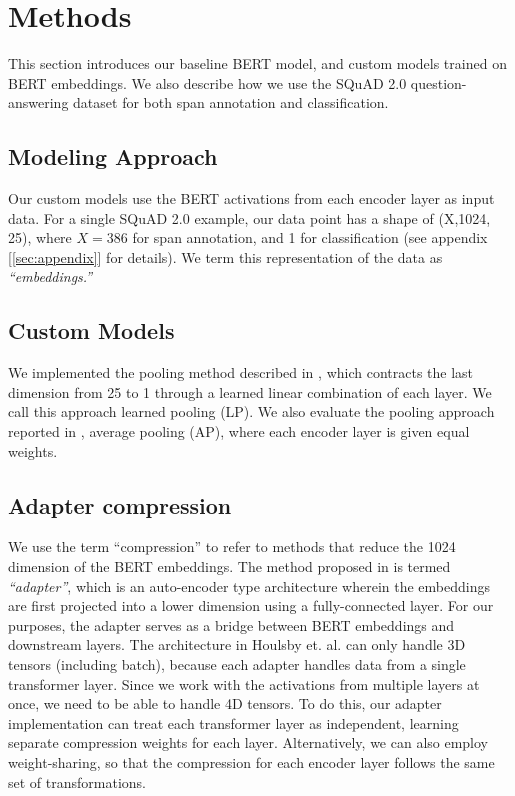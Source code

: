 \section{Methods}
\label{sec:methods}

This section introduces our baseline BERT model, and custom models trained on BERT embeddings. We also describe how we use the SQuAD 2.0 question-answering dataset for both span annotation and classification.

\subsection{Modeling Approach}

Our custom models use the BERT activations from each encoder layer as input data. For a single SQuAD 2.0 example, our data point has a shape of (X,1024, 25), where $X=386$ for span annotation, and 1 for classification (see appendix [\ref{sec:appendix}] for details). We term this representation of the data as \textit{“embeddings.”}

\subsection{Custom Models}

We implemented the pooling method described in \cite{Tenney2020}, which contracts the last dimension from 25 to 1 through a learned linear combination of each layer. We call this approach learned pooling (LP). We also evaluate the pooling approach reported in \cite{ma2019universal}, average pooling (AP), where each encoder layer is given equal weights. 

\subsection{Adapter compression}

We use the term “compression” to refer to methods that reduce the 1024 dimension of the BERT embeddings. The method proposed in \cite{DBLP:journals/corr/abs-1902-00751} is termed \textit{“adapter”}, which is an auto-encoder type architecture wherein the embeddings are first projected into a lower dimension using a fully-connected layer. For our purposes, the adapter serves as a bridge between BERT embeddings and downstream layers. The architecture in Houlsby et. al. can only handle 3D tensors (including batch), because each adapter handles data from a single transformer layer. Since we work with the activations from multiple layers at once, we need to be able to handle 4D tensors. To do this, our adapter implementation can treat each transformer layer as independent, learning separate compression weights for each layer. Alternatively, we can also employ weight-sharing, so that the compression for each encoder layer follows the same set of transformations. \\

